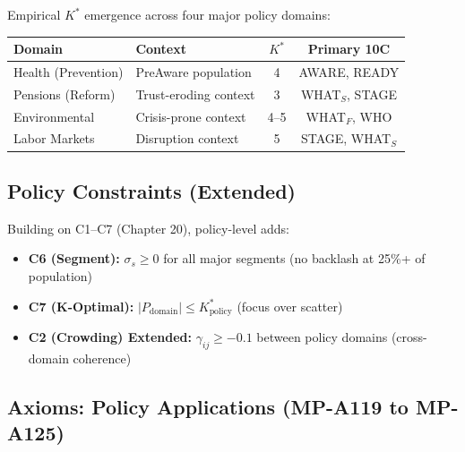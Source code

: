 Empirical $K^*$ emergence across four major policy domains:

\begin{center}
\begin{tabular}{@{}llcc@{}}
\toprule
\textbf{Domain} & \textbf{Context} & \textbf{$K^*$} & \textbf{Primary 10C} \\
\midrule
Health (Prevention) & PreAware population & 4 & AWARE, READY \\
Pensions (Reform) & Trust-eroding context & 3 & WHAT$_S$, STAGE \\
Environmental & Crisis-prone context & 4--5 & WHAT$_F$, WHO \\
Labor Markets & Disruption context & 5 & STAGE, WHAT$_S$ \\
\bottomrule
\end{tabular}
\end{center}

\subsection{Policy Constraints (Extended)}

Building on C1--C7 (Chapter 20), policy-level adds:

\begin{itemize}[nosep]
\item \textbf{C6 (Segment):} $\sigma_s \geq 0$ for all major segments (no backlash at 25\%+ of population)
\item \textbf{C7 (K-Optimal):} $|P_{\text{domain}}| \leq K^*_{\text{policy}}$ (focus over scatter)
\item \textbf{C2 (Crowding) Extended:} $\gamma_{ij} \geq -0.1$ between policy domains (cross-domain coherence)
\end{itemize}

\subsection{Axioms: Policy Applications (MP-A119 to MP-A125)}

